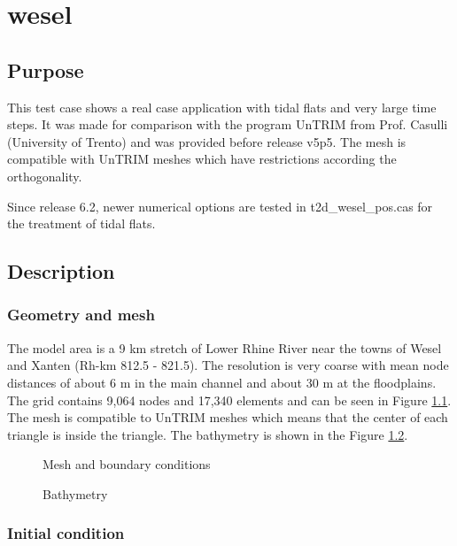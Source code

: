 \chapter{wesel}

\section{Purpose}
This test case shows a real case application
with tidal flats and very large time steps.
It was made for comparison with the program UnTRIM
from Prof. Casulli (University of Trento)
and was provided before release v5p5.
The mesh is compatible with UnTRIM meshes which have restrictions according the
orthogonality.

Since release 6.2, newer numerical options are tested in t2d\_wesel\_pos.cas
for the treatment of tidal flats. 

\section{Description}

\subsection{Geometry and mesh}
The model area is a 9 km stretch of Lower Rhine River near the towns of Wesel
and Xanten (Rh-km 812.5 - 821.5).
The resolution is very coarse with mean node distances of about 6 m in the main
channel and about 30 m at the floodplains.
The grid contains 9,064 nodes and 17,340 elements and can be seen in Figure
\ref{t2d:wesel:mesh}.
The mesh is compatible to UnTRIM meshes which means that the center of each
triangle is inside the triangle.
The bathymetry is shown in the Figure \ref{t2d:wesel:Bathy}.

\begin{figure}[h!]
\centering
{}
\caption{Mesh and boundary conditions}
\label{t2d:wesel:mesh}
\end{figure}


\begin{figure} [h!]
\centering
{}
\caption{Bathymetry}
\label{t2d:wesel:Bathy}
\end{figure}


\subsection{Initial condition}

